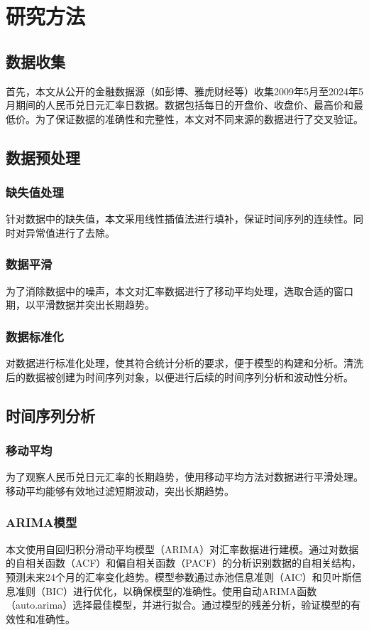 
\chapter{研究方法}

\section{数据收集}
首先，本文从公开的金融数据源（如彭博、雅虎财经等）收集2009年5月至2024年5月期间的人民币兑日元汇率日数据。数据包括每日的开盘价、收盘价、最高价和最低价。为了保证数据的准确性和完整性，本文对不同来源的数据进行了交叉验证。

\section{数据预处理}
\subsection{缺失值处理}
针对数据中的缺失值，本文采用线性插值法进行填补，保证时间序列的连续性。同时对异常值进行了去除。
\subsection{数据平滑}
为了消除数据中的噪声，本文对汇率数据进行了移动平均处理，选取合适的窗口期，以平滑数据并突出长期趋势。
\subsection{数据标准化}
对数据进行标准化处理，使其符合统计分析的要求，便于模型的构建和分析。清洗后的数据被创建为时间序列对象，以便进行后续的时间序列分析和波动性分析。

\section{时间序列分析}
\subsection{移动平均}
为了观察人民币兑日元汇率的长期趋势，使用移动平均方法对数据进行平滑处理。移动平均能够有效地过滤短期波动，突出长期趋势。
\subsection{ARIMA模型}
本文使用自回归积分滑动平均模型（ARIMA）对汇率数据进行建模。通过对数据的自相关函数（ACF）和偏自相关函数（PACF）的分析识别数据的自相关结构，预测未来24个月的汇率变化趋势。模型参数通过赤池信息准则（AIC）和贝叶斯信息准则（BIC）进行优化，以确保模型的准确性。使用自动ARIMA函数（auto.arima）选择最佳模型，并进行拟合。通过模型的残差分析，验证模型的有效性和准确性。

